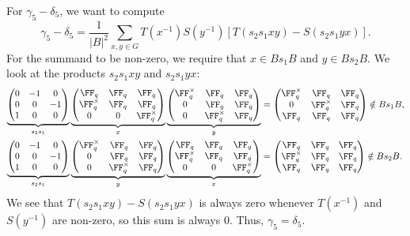 \documentclass[11pt]{amsart}
\theoremstyle{remark}
\begin{document}
For $\gamma_5-\delta_5$, we want to compute
\[
	\gamma_5-\delta_5 = \frac{1}{|B|^2}\sum_{x,y\in G} T(x^{-1})S(y^{-1})[T(s_2s_1xy)-S(s_2s_1yx)].
\]
For the summand to be non-zero, we require that $x\in Bs_1B$ and $y\in Bs_2B$.
We look at the products $s_2s_1xy$ and $s_2s_1yx$:
\begin{align*}
	\underbrace{\begin{pmatrix}
			0 & -1 & 0  \\
			0 & 0  & -1 \\
			1 & 0  & 0
		\end{pmatrix}}_{s_2s_1}
	\underbrace{\begin{pmatrix}
			\FF_q        & \FF_q & \FF_q        \\
			\FF_q^\times & \FF_q & \FF_q        \\
			0            & 0     & \FF_q^\times
		\end{pmatrix}}_{x}
	\underbrace{\begin{pmatrix}
			\FF_q^\times & \FF_q        & \FF_q \\
			0            & \FF_q        & \FF_q \\
			0            & \FF_q^\times & \FF_q
		\end{pmatrix}}_{y} & =
	\begin{pmatrix}
		\FF_q^\times & \FF_q        & \FF_q \\
		0            & \FF_q^\times & \FF_q \\
		\FF_q        & \FF_q        & \FF_q
	\end{pmatrix}\notin Bs_1B,         \\
	\underbrace{\begin{pmatrix}
			0 & -1 & 0  \\
			0 & 0  & -1 \\
			1 & 0  & 0
		\end{pmatrix}}_{s_2s_1}
	\underbrace{\begin{pmatrix}
			\FF_q^\times & \FF_q        & \FF_q \\
			0            & \FF_q        & \FF_q \\
			0            & \FF_q^\times & \FF_q
		\end{pmatrix}}_{y}
	\underbrace{\begin{pmatrix}
			\FF_q        & \FF_q & \FF_q        \\
			\FF_q^\times & \FF_q & \FF_q        \\
			0            & 0     & \FF_q^\times
		\end{pmatrix}}_{x} & =
	\begin{pmatrix}
		\FF_q        & \FF_q & \FF_q \\
		\FF_q^\times & \FF_q & \FF_q \\
		\FF_q        & \FF_q & \FF_q
	\end{pmatrix}\notin Bs_2B.
\end{align*}
We see that $T(s_2s_1xy)-S(s_2s_1yx)$ is always zero whenever $T(x^{-1})$ and $S(y^{-1})$ are non-zero, so this sum is always $0$.
Thus, $\gamma_5=\delta_5$.
\end{document}
